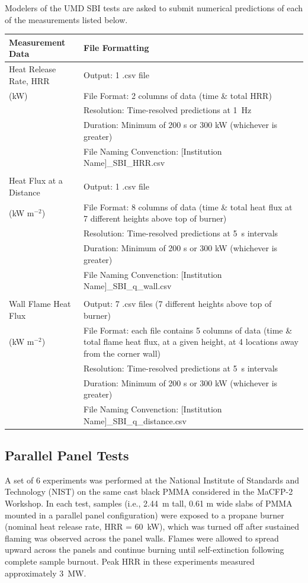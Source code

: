 \documentclass[12pt]{article}
\begin{document}
Modelers of the UMD SBI tests are asked to submit numerical predictions of each of the measurements listed below.
\begin{table}[htb]
\begin{tabular}{p{0.25\linewidth} | p{0.75\linewidth}}
\hline
\textbf{Measurement Data}       	& \textbf{File Formatting } \\
\hline
Heat Release Rate, HRR 	& Output: 1 .csv file\\
(kW)& File Format: 2 columns of data (time \& total HRR)\\
	& Resolution: Time-resolved predictions at 1~Hz \\
	& Duration: Minimum of 200 s or 300 kW (whichever is greater) \\
	& File Naming Convenction: [Institution Name]\_SBI\_HRR.csv \\
&	\\
Heat Flux at a Distance  & Output: 1 .csv file\\
(kW m$^{-2}$)& File Format: 8 columns of data (time \& total heat flux at 7 different heights above top of burner)\\ 
	& Resolution: Time-resolved predictions at 5~s intervals \\
	& Duration: Minimum of 200 s or 300 kW (whichever is greater) \\
	& File Naming Convenction: [Institution Name]\_SBI\_q\_wall.csv \\
&	\\
Wall Flame Heat Flux & Output: 7 .csv files (7 different heights above top of burner) \\
(kW m$^{-2}$)& File Format: each file contains 5 columns of data (time \& total flame heat flux, at a given height, at 4 locations away from the corner wall)\\
	& Resolution: Time-resolved predictions at 5~s intervals \\
	& Duration: Minimum of 200 s or 300 kW (whichever is greater) \\
	& File Naming Convenction: [Institution Name]\_SBI\_q\_distance.csv \\
\hline
\end{tabular}
\end{table}

\FloatBarrier
\subsection {Parallel Panel Tests}
A set of 6 experiments was performed at the National Institute of Standards and Technology (NIST) on the same cast black PMMA considered in the MaCFP-2 Workshop. In each test, samples (i.e., 2.44~m tall, 0.61 m wide slabs of PMMA mounted in a parallel panel configuration) were exposed to a propane burner (nominal heat release rate, HRR = 60~kW), which was turned off after sustained flaming was observed across the panel walls. Flames were allowed to spread upward across the panels and continue burning until self-extinction following complete sample burnout. Peak HRR in these experiments measured approximately 3~MW.
\end{document}
